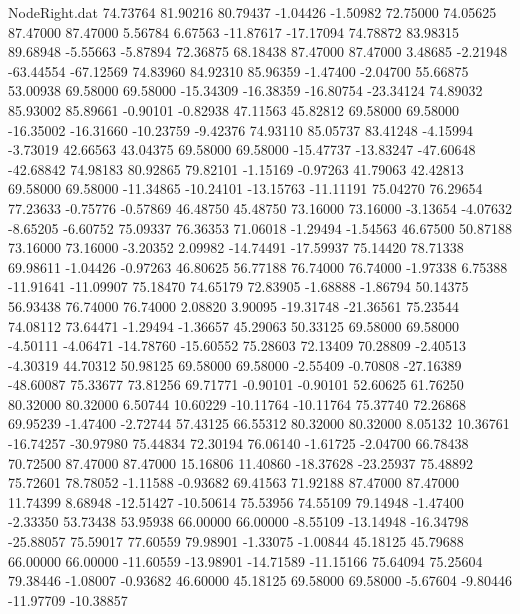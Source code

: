 \begin{filecontents}{NodeRight.dat}
  74.73764   81.90216   80.79437    -1.04426   -1.50982   72.75000   74.05625   87.47000   87.47000    5.56784    6.67563  -11.87617  -17.17094
  74.78872   83.98315   89.68948    -5.55663   -5.87894   72.36875   68.18438   87.47000   87.47000    3.48685   -2.21948  -63.44554  -67.12569
  74.83960   84.92310   85.96359    -1.47400   -2.04700   55.66875   53.00938   69.58000   69.58000  -15.34309  -16.38359  -16.80754  -23.34124
  74.89032   85.93002   85.89661    -0.90101   -0.82938   47.11563   45.82812   69.58000   69.58000  -16.35002  -16.31660  -10.23759   -9.42376
  74.93110   85.05737   83.41248    -4.15994   -3.73019   42.66563   43.04375   69.58000   69.58000  -15.47737  -13.83247  -47.60648  -42.68842
  74.98183   80.92865   79.82101    -1.15169   -0.97263   41.79063   42.42813   69.58000   69.58000  -11.34865  -10.24101  -13.15763  -11.11191
  75.04270   76.29654   77.23633    -0.75776   -0.57869   46.48750   45.48750   73.16000   73.16000   -3.13654   -4.07632   -8.65205   -6.60752
  75.09337   76.36353   71.06018    -1.29494   -1.54563   46.67500   50.87188   73.16000   73.16000   -3.20352    2.09982  -14.74491  -17.59937
  75.14420   78.71338   69.98611    -1.04426   -0.97263   46.80625   56.77188   76.74000   76.74000   -1.97338    6.75388  -11.91641  -11.09907
  75.18470   74.65179   72.83905    -1.68888   -1.86794   50.14375   56.93438   76.74000   76.74000    2.08820    3.90095  -19.31748  -21.36561
  75.23544   74.08112   73.64471    -1.29494   -1.36657   45.29063   50.33125   69.58000   69.58000   -4.50111   -4.06471  -14.78760  -15.60552
  75.28603   72.13409   70.28809    -2.40513   -4.30319   44.70312   50.98125   69.58000   69.58000   -2.55409   -0.70808  -27.16389  -48.60087
  75.33677   73.81256   69.71771    -0.90101   -0.90101   52.60625   61.76250   80.32000   80.32000    6.50744   10.60229  -10.11764  -10.11764
  75.37740   72.26868   69.95239    -1.47400   -2.72744   57.43125   66.55312   80.32000   80.32000    8.05132   10.36761  -16.74257  -30.97980
  75.44834   72.30194   76.06140    -1.61725   -2.04700   66.78438   70.72500   87.47000   87.47000   15.16806   11.40860  -18.37628  -23.25937
  75.48892   75.72601   78.78052    -1.11588   -0.93682   69.41563   71.92188   87.47000   87.47000   11.74399    8.68948  -12.51427  -10.50614
  75.53956   74.55109   79.14948    -1.47400   -2.33350   53.73438   53.95938   66.00000   66.00000   -8.55109  -13.14948  -16.34798  -25.88057
  75.59017   77.60559   79.98901    -1.33075   -1.00844   45.18125   45.79688   66.00000   66.00000  -11.60559  -13.98901  -14.71589  -11.15166
  75.64094   75.25604   79.38446    -1.08007   -0.93682   46.60000   45.18125   69.58000   69.58000   -5.67604   -9.80446  -11.97709  -10.38857

\end{filecontents}

